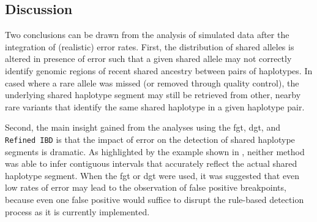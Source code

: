 %
%
%
%


%
\subsection{Discussion}
%

Two conclusions can be drawn from the analysis of simulated data after the integration of (realistic) error rates.
First, the distribution of shared alleles is altered in presence of error such that a given shared allele may not correctly identify genomic regions of recent shared ancestry between pairs of haplotypes.
In cased where a rare allele was missed (or removed through quality control), the underlying shared haplotype segment may still be retrieved from other, nearby rare variants that identify the same shared haplotype in a given haplotype pair.

Second, the main insight gained from the analyses using the \gls{fgt}, \gls{dgt}, and \texttt{Refined\,IBD} is that the impact of error on the detection of shared haplotype segments is dramatic.
As highlighted by the example shown in , neither method was able to infer contiguous intervals that accurately reflect the actual shared haplotype segment.
When the \gls{fgt} or \gls{dgt} were used, it was suggested that even low rates of error may lead to the observation of false positive breakpoints, because even one false positive would suffice to disrupt the rule-based detection process as it is currently implemented.

